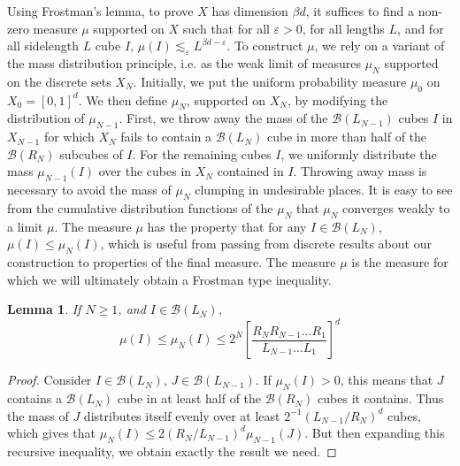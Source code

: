 \documentclass{article}
\theoremstyle{plain}
\newtheorem{lemma}{Lemma}
\theoremstyle{plain}
\begin{document}
\begin{multicols}{2}
Using Frostman's lemma, to prove $X$ has dimension $\beta d$, it suffices to find a non-zero measure $\mu$ supported on $X$ such that for all $\varepsilon > 0$, for all lengths $L$, and for all sidelength $L$ cube $I$, $\mu(I) \lesssim_\varepsilon L^{\beta d - \varepsilon}$. To construct $\mu$, we rely on a variant of the mass distribution principle, i.e. as the weak limit of measures $\mu_N$ supported on the discrete sets $X_N$. Initially, we put the uniform probability measure $\mu_0$ on $X_0 = [0,1]^d$. We then define $\mu_N$, supported on $X_N$, by modifying the distribution of $\mu_{N-1}$. First, we throw away the mass of the $\mathcal{B}(L_{N-1})$ cubes $I$ in $X_{N-1}$ for which $X_N$ fails to contain a $\mathcal{B}(L_N)$ cube in more than half of the $\mathcal{B}(R_N)$ subcubes of $I$. For the remaining cubes $I$, we uniformly distribute the mass $\mu_{N-1}(I)$ over the cubes in $X_N$ contained in $I$. Throwing away mass is necessary to avoid the mass of $\mu_N$ clumping in undesirable places. It is easy to see from the cumulative distribution functions of the $\mu_N$ that $\mu_N$ converges weakly to a limit $\mu$. The measure $\mu$ has the property that for any $I \in \mathcal{B}(L_N)$, $\mu(I) \leq \mu_N(I)$, which is useful from passing from discrete results about our construction to properties of the final measure. The measure $\mu$ is the measure for which we will ultimately obtain a Frostman type inequality.

\begin{lemma}
	If $N \geq 1$, and $I \in \mathcal{B}(L_N)$,
	\[ \mu(I) \leq \mu_N(I) \leq 2^N \left[ \frac{R_N R_{N-1} \dots R_1}{L_{N-1} \dots L_1} \right]^d \]
\end{lemma}
\begin{proof}
	Consider $I \in \mathcal{B}(L_N)$, $J \in \mathcal{B}(L_{N-1})$. If $\mu_N(I) > 0$, this means that $J$ contains a $\mathcal{B}(L_N)$ cube in at least half of the $\mathcal{B}(R_N)$ cubes it contains. Thus the mass of $J$ distributes itself evenly over at least $2^{-1} (L_{N-1}/R_N)^d$ cubes, which gives that $\mu_N(I) \leq 2(R_N/L_{N-1})^d \mu_{N-1}(J)$. But then expanding this recursive inequality, we obtain exactly the result we need.
\end{proof}


\end{multicols}
\end{document}
